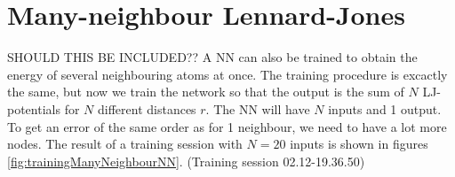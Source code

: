 \documentclass[twoside,english]{uiofysmaster}
\begin{document}
\section{Many-neighbour Lennard-Jones}
SHOULD THIS BE INCLUDED??
A NN can also be trained to obtain the energy of several neighbouring atoms at once. 
The training procedure is excactly the same, but now we train the network so that the output
is the sum of $N$ LJ-potentials for $N$ different distances $r$. The NN will have $N$ inputs and 1 output. 
To get an error of the same order as for 1 neighbour, we need to have a lot more nodes. The result of a training
session with $N=20$ inputs is shown in figures \autoref{fig:trainingManyNeighbourNN}. 
(Training session 02.12-19.36.50)

\end{document}
